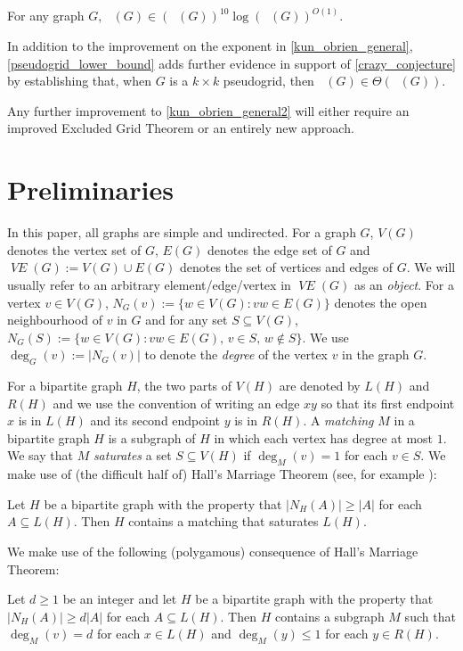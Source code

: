 \documentclass{patmorin}
\newcommand{\defin}[1]{\emph{\color{brightmaroon}#1}}
\DeclareMathOperator{\chicen}{\chi_{\mathrm{cen}}}
\DeclareMathOperator{\chilin}{\chi_{\mathrm{lin}}}
\DeclareMathOperator{\VE}{\mathit{VE}}
\begin{document}
\begin{thm}\label{kun_obrien_general2}
  For any graph $G$, $\chicen(G)\in (\chilin(G))^{10}\log(\chilin(G))^{O(1)}$.
\end{thm}

In addition to the improvement on the exponent in \cref{kun_obrien_general}, \cref{pseudogrid_lower_bound} adds further evidence in support of \cref{crazy_conjecture} by establishing that, when $G$ is a $k\times k$ pseudogrid, then $\chicen(G)\in\Theta(\chilin(G))$.

Any further improvement to \cref{kun_obrien_general2} will either require an improved Excluded Grid Theorem or an entirely new approach.


\section{Preliminaries}

In this paper, all graphs are simple and undirected. For a graph $G$, $V(G)$ denotes the vertex set of $G$, $E(G)$ denotes the edge set of $G$ and $\VE(G):=V(G)\cup E(G)$ denotes the set of vertices and edges of $G$. We will usually refer to an arbitrary element/edge/vertex in $\VE(G)$ as an \defin{object}. For a vertex $v\in V(G)$,  $N_G(v):=\{w\in V(G):vw\in E(G)\}$  denotes the open neighbourhood of $v$ in $G$ and for any set $S\subseteq V(G)$, $N_G(S):=\{w\in V(G):vw\in E(G),\, v\in S,\, w\not\in S\}$.  We use $\deg_G(v):=|N_G(v)|$ to denote the \defin{degree} of the vertex $v$ in the graph $G$.

For a  bipartite graph $H$, the two parts of $V(H)$ are denoted by $L(H)$ and $R(H)$ and we use the convention of writing an edge $xy$ so that its first endpoint $x$ is in $L(H)$ and its second endpoint $y$ is in $R(H)$.  A \defin{matching} $M$ in a bipartite graph $H$ is a subgraph of $H$ in which each vertex has degree at most $1$.  We say that $M$ \defin{saturates} a set $S\subseteq V(H)$ if $\deg_M(v)=1$ for each $v\in S$.  We make use of (the difficult half of) Hall's Marriage Theorem (see, for example \citet[Theorem~2.1.2]{diestel:graph}):

\begin{thm}\label{hall}
  Let $H$ be a bipartite graph with the property that $|N_H(A)|\ge |A|$ for each $A\subseteq L(H)$.  Then $H$ contains a matching that saturates $L(H)$.
\end{thm}

We make use of the following (polygamous) consequence of Hall's Marriage Theorem:
\begin{cor}\label{d_hall}
  Let $d\ge 1$ be an integer and let $H$ be a bipartite graph with the property that $|N_H(A)|\ge d|A|$ for each $A\subseteq L(H)$.  Then $H$ contains a subgraph $M$ such that $\deg_M(v)=d$ for each $x\in L(H)$ and $\deg_M(y)\le 1$ for each $y\in R(H)$.
\end{cor}
\end{document}
